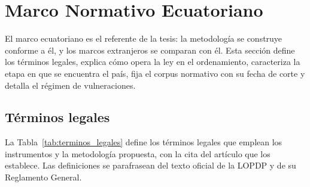 \section{Marco Normativo Ecuatoriano}
\label{sec:marco_ecuador}

El marco ecuatoriano es el referente de la tesis: la metodología se construye conforme a él, y los marcos extranjeros se comparan con él. Esta sección define los términos legales, explica cómo opera la ley en el ordenamiento, caracteriza la etapa en que se encuentra el país, fija el corpus normativo con su fecha de corte y detalla el régimen de vulneraciones.

\subsection{Términos legales}
\label{sec:terminos_legales}

La Tabla~\ref{tab:terminos_legales} define los términos legales que emplean los instrumentos y la metodología propuesta, con la cita del artículo que los establece. Las definiciones se parafrasean del texto oficial de la LOPDP y de su Reglamento General.

